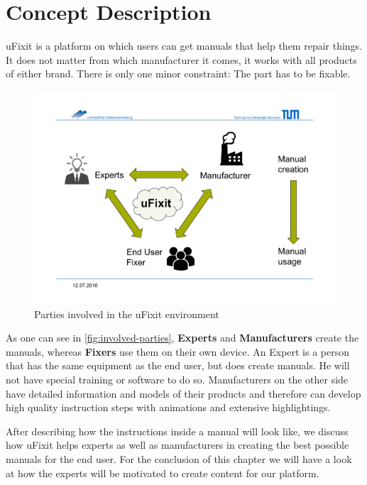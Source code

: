 
\chapter{Concept Description}

	uFixit is a platform on which users can get manuals that help them repair things. It does not matter from which manufacturer it comes, it works with all products of either brand. There is only one minor constraint: The part has to be fixable.
	
	\begin{figure}[H]
		\includegraphics[width=\textwidth, trim=0cm 3cm 0cm 4cm, clip]{../images/involved-parties.pdf}
		\centering
		\caption{Parties involved in the uFixit environment}
		\label{fig:involved-parties}
	\end{figure}

	As one can see in \autoref{fig:involved-parties}, \textbf{Experts} and \textbf{Manufacturers} create the manuals, whereas \textbf{Fixers} use them on their own device. An Expert is a person that has the same equipment as the end user, but does create manuals. He will not have special training or software to do so. Manufacturers on the other side have detailed information and models of their products and therefore can develop high quality instruction steps with animations and extensive highlightings.
	
	After describing how the instructions inside a manual will look like, we discuss how uFixit helps experts as well as manufacturers in creating the best possible manuals for the end user. For the conclusion of this chapter we will have a look at how the experts will be motivated to create content for our platform.


